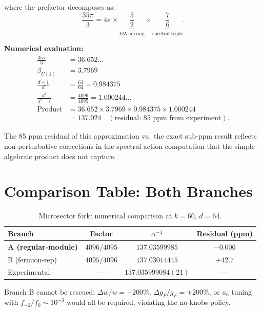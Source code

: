 \documentclass[12pt,a4paper]{article}
\begin{document}
where the prefactor decomposes as:
\begin{equation}
\frac{35\pi}{3} = 4\pi \times \underbrace{\frac{5}{2}}_{\text{EW mixing}}
\times \underbrace{\frac{7}{6}}_{\text{spectral triple}}.
\end{equation}

\textbf{Numerical evaluation:}
\begin{align}
\frac{35\pi}{3} &= 36.652\ldots \\
\beta_{U(1)} &= 3.7969 \\
\frac{d-1}{d} &= \frac{63}{64} = 0.984375 \\
\frac{d^2}{d^2-1} &= \frac{4096}{4095} = 1.000244\ldots \\
\text{Product} &= 36.652 \times 3.7969 \times 0.984375 \times 1.000244 \\
&= 137.024 \quad (\text{residual: } 85\text{ ppm from experiment}).
\end{align}

The 85 ppm residual of this approximation vs.\ the exact sub-ppm
result reflects non-perturbative corrections in the spectral action
computation that the simple algebraic product does not capture.

\section{Comparison Table: Both Branches}
\label{sec:branches}

\begin{table}[h]
\centering
\caption{Microsector fork: numerical comparison at $k = 60$, $d = 64$.}
\renewcommand{\arraystretch}{1.3}
\begin{tabular}{lccc}
\toprule
Branch & Factor & $\alpha^{-1}$ & Residual (ppm) \\
\midrule
\textbf{A (regular-module)} & $4096/4095$ & $137.03599985$ & $-0.006$ \\
B (fermion-rep) & $4095/4096$ & $137.03014445$ & $+42.7$ \\
\midrule
Experimental & --- & $137.035999084(21)$ & --- \\
\bottomrule
\end{tabular}
\end{table}

Branch B cannot be rescued: $\Delta w/w = -200\%$, $\Delta g_F/g_F = +200\%$,
or $a_6$ tuning with $f_{-2}/f_0 \sim 10^{-3}$ would all be required,
violating the no-knobs policy.
\end{document}
